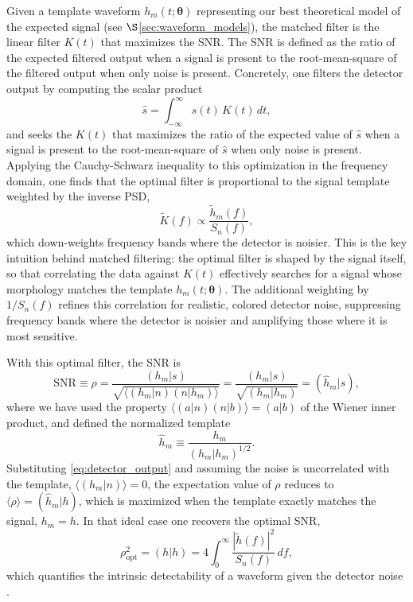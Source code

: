 Given a template waveform $h_m(t;\boldsymbol{\theta})$ representing our best theoretical model of the expected signal (see $\S$\ref{sec:waveform_models}), the matched filter is the linear filter $K(t)$ that maximizes the SNR. The SNR is defined as the ratio of the expected filtered output when a signal is present to the root-mean-square of the filtered output when only noise is present. Concretely, one filters the detector output by computing the scalar product
\begin{equation}
    \hat{s} = \int_{-\infty}^{\infty} s(t)\,K(t)\,dt,
\end{equation}
and seeks the $K(t)$ that maximizes the ratio of the expected value of $\hat{s}$ when a signal is present to the root-mean-square of $\hat{s}$ when only noise is present. Applying the Cauchy-Schwarz inequality to this optimization in the frequency domain, one finds that the optimal filter is proportional to the signal template weighted by the inverse PSD,
\begin{equation}
    \tilde{K}(f) \propto \frac{\tilde{h}_m(f)}{S_n(f)},
    \label{eq:optimal_filter}
\end{equation}
which down-weights frequency bands where the detector is noisier. This is the key intuition behind matched filtering: the optimal filter is shaped by the signal itself, so that correlating the data against $K(t)$ effectively searches for a signal whose morphology matches the template $h_m(t;\boldsymbol{\theta})$. The additional weighting by $1/S_n(f)$ refines this correlation for realistic, colored detector noise, suppressing frequency bands where the detector is noisier and amplifying those where it is most sensitive.

With this optimal filter, the SNR is
\begin{equation}
    \mathrm{SNR} \equiv \rho = \frac{(h_m|s)}{\sqrt{\langle(h_m|n)(n|h_m)\rangle}} 
    = \frac{(h_m|s)}{\sqrt{(h_m|h_m)}} 
    = (\hat{h}_m|s),
    \label{eq:SNR_MF}
\end{equation}
where we have used the property $\langle(a|n)(n|b)\rangle = (a|b)$ of the Wiener inner product, and defined the normalized template
\begin{equation}
    \hat{h}_m \equiv \frac{h_m}{(h_m|h_m)^{1/2}}.
\end{equation}
Substituting 
\eqref{eq:detector_output} and assuming the noise is uncorrelated with the template, $\langle(h_m|n)\rangle = 0$, the expectation value of $\rho$ reduces to $\langle\rho\rangle = (\hat{h}_m|h)$, which is maximized when the template exactly matches the signal, $h_m = h$. In that ideal case one recovers the optimal SNR,
\begin{equation}
    \rho_\mathrm{opt}^2 = (h|h) 
    = 4\int_0^\infty \frac{|\tilde{h}(f)|^2}{S_n(f)}\,df,
    \label{eq:optimal_SNR}
\end{equation}
which quantifies the intrinsic detectability of a waveform given the detector noise \cite{Optimal_SNR}. 

